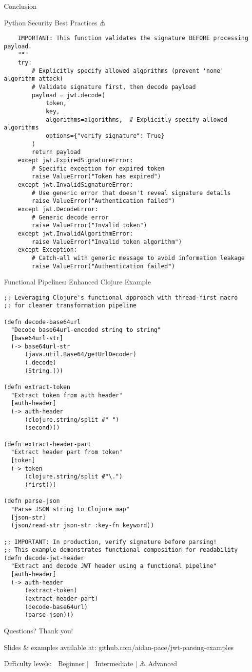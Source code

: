 \documentclass[presentation,aspectratio=169]{beamer}
\begin{document}
\begin{frame}[label={sec:orgab55db2},fragile]{Conclusion}
\begin{block}{Python Security Best Practices ⚠️}
\begin{verbatim}
    IMPORTANT: This function validates the signature BEFORE processing payload.
    """
    try:
        # Explicitly specify allowed algorithms (prevent 'none' algorithm attack)
        # Validate signature first, then decode payload
        payload = jwt.decode(
            token,
            key,
            algorithms=algorithms,  # Explicitly specify allowed algorithms
            options={"verify_signature": True}
        )
        return payload
    except jwt.ExpiredSignatureError:
        # Specific exception for expired token
        raise ValueError("Token has expired")
    except jwt.InvalidSignatureError:
        # Use generic error that doesn't reveal signature details
        raise ValueError("Authentication failed")
    except jwt.DecodeError:
        # Generic decode error
        raise ValueError("Invalid token")
    except jwt.InvalidAlgorithmError:
        raise ValueError("Invalid token algorithm")
    except Exception:
        # Catch-all with generic message to avoid information leakage
        raise ValueError("Authentication failed")
\end{verbatim}
\end{block}
\begin{block}{Functional Pipelines: Enhanced Clojure Example 🧩}
\begin{verbatim}
;; Leveraging Clojure's functional approach with thread-first macro
;; for cleaner transformation pipeline

(defn decode-base64url
  "Decode base64url-encoded string to string"
  [base64url-str]
  (-> base64url-str
      (java.util.Base64/getUrlDecoder)
      (.decode)
      (String.)))

(defn extract-token
  "Extract token from auth header"
  [auth-header]
  (-> auth-header
      (clojure.string/split #" ")
      (second)))

(defn extract-header-part
  "Extract header part from token"
  [token]
  (-> token
      (clojure.string/split #"\.")
      (first)))

(defn parse-json
  "Parse JSON string to Clojure map"
  [json-str]
  (json/read-str json-str :key-fn keyword))

;; IMPORTANT: In production, verify signature before parsing!
;; This example demonstrates functional composition for readability
(defn decode-jwt-header
  "Extract and decode JWT header using a functional pipeline"
  [auth-header]
  (-> auth-header
      (extract-token)
      (extract-header-part)
      (decode-base64url)
      (parse-json)))
\end{verbatim}
\end{block}
\begin{block}{Questions?}
Thank you!

\alert{Slides \& examples available at:} 
github.com/aidan-pace/jwt-parsing-examples

\alert{Difficulty levels:} 🔰 Beginner | 🧩 Intermediate | ⚠️ Advanced
\end{block}
\end{frame}
\end{document}
